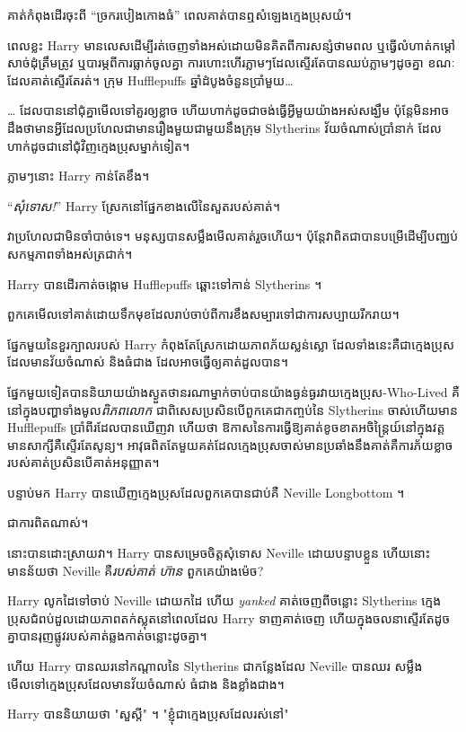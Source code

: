 គាត់​កំពុង​ដើរ​ចុះ​ពី​ “ច្រក​របៀង​កោង​ធំ” ពេល​គាត់​បាន​ឮ​សំឡេង​ក្មេង​ប្រុស​យំ។

ពេលខ្លះ Harry មានលេសដើម្បីរត់ចេញទាំងអស់ដោយមិនគិតពីការសន្សំថាមពល ឬធ្វើលំហាត់កម្ដៅសាច់ដុំត្រឹមត្រូវ ឬបារម្ភពីការធ្លាក់ចូលគ្នា ការហោះហើរភ្លាមៗដែលស្ទើរតែបានឈប់ភ្លាមៗដូចគ្នា ខណៈដែលគាត់ស្ទើរតែរត់។ ក្រុម Hufflepuffs ឆ្នាំដំបូងចំនួនប្រាំមួយ…

… ដែល​បាន​នៅ​ជុំ​គ្នា​មើល​ទៅ​គួរ​ឲ្យ​ខ្លាច ហើយ​ហាក់​ដូច​ជា​ចង់​ធ្វើ​អ្វី​មួយ​យ៉ាង​អស់​សង្ឃឹម ប៉ុន្តែ​មិន​អាច​ដឹង​ថា​មាន​អ្វី​ដែល​ប្រហែល​ជា​មាន​រឿង​មួយ​ជាមួយ​នឹង​ក្រុម Slytherins វ័យ​ចំណាស់​ប្រាំ​នាក់ ដែល​ហាក់​ដូច​ជា​នៅ​ជុំវិញ​ក្មេង​ប្រុស​ម្នាក់​ទៀត។

ភ្លាមៗនោះ Harry កាន់តែខឹង។

“\emph{សុំទោស!}” Harry ស្រែកនៅផ្នែកខាងលើនៃសួតរបស់គាត់។

វាប្រហែលជាមិនចាំបាច់ទេ។ មនុស្សបានសម្លឹងមើលគាត់រួចហើយ។ ប៉ុន្តែវាពិតជាបានបម្រើដើម្បីបញ្ឈប់សកម្មភាពទាំងអស់ត្រជាក់។

Harry បានដើរកាត់ចង្កោម Hufflepuffs ឆ្ពោះទៅកាន់ Slytherins ។

ពួក​គេ​មើល​ទៅ​គាត់​ដោយ​ទឹក​មុខ​ដែល​រាប់​ចាប់​ពី​ការ​ខឹង​សម្បារ​ទៅ​ជា​ការ​សប្បាយ​រីករាយ។

ផ្នែកមួយនៃខួរក្បាលរបស់ Harry កំពុងតែស្រែកដោយភាពភ័យស្លន់ស្លោ ដែលទាំងនេះគឺជាក្មេងប្រុសដែលមានវ័យចំណាស់ និងធំជាង ដែលអាចធ្វើឲ្យគាត់ដួលបាន។

ផ្នែកមួយទៀតបាននិយាយយ៉ាងស្ងួតថានរណាម្នាក់ចាប់បានយ៉ាងធ្ងន់ធ្ងរវាយក្មេងប្រុស-Who-Lived គឺនៅក្នុងបញ្ហាទាំងមូល\emph{ពិភពលោក} ជាពិសេសប្រសិនបើពួកគេជាកញ្ចប់នៃ Slytherins ចាស់ហើយមាន Hufflepuffs ប្រាំពីរដែលបានឃើញវា ហើយថា ឱកាសនៃការធ្វើឱ្យគាត់ខូចខាតអចិន្ត្រៃយ៍នៅក្នុងវត្តមានសាក្សីគឺស្ទើរតែសូន្យ។ អាវុធពិតតែមួយគត់ដែលក្មេងប្រុសចាស់មានប្រឆាំងនឹងគាត់គឺការភ័យខ្លាចរបស់គាត់ប្រសិនបើគាត់អនុញ្ញាត។

បន្ទាប់មក Harry បានឃើញក្មេងប្រុសដែលពួកគេបានជាប់គឺ Neville Longbottom ។

ជាការពិតណាស់។

នោះបានដោះស្រាយវា។ Harry បានសម្រេចចិត្តសុំទោស Neville ដោយបន្ទាបខ្លួន ហើយនោះមានន័យថា Neville គឺ\emph{របស់គាត់} \emph{ហ៊ាន} ពួកគេយ៉ាងម៉េច?

Harry លូកដៃទៅចាប់ Neville ដោយកដៃ ហើយ \emph{yanked} គាត់ចេញពីចន្លោះ Slytherins ក្មេងប្រុសជំពប់ដួលដោយភាពតក់ស្លុតនៅពេលដែល Harry ទាញគាត់ចេញ ហើយក្នុងចលនាស្ទើរតែដូចគ្នាបានរុញផ្លូវរបស់គាត់ឆ្លងកាត់ចន្លោះដូចគ្នា។

ហើយ Harry បានឈរនៅកណ្តាលនៃ Slytherins ជាកន្លែងដែល Neville បានឈរ សម្លឹងមើលទៅក្មេងប្រុសដែលមានវ័យចំណាស់ ធំជាង និងខ្លាំងជាង។

Harry បាននិយាយថា "សួស្តី" ។ "ខ្ញុំជាក្មេងប្រុសដែលរស់នៅ"

